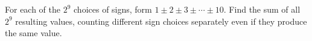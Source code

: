 For each of the $2^9$ choices of signs, form $1\pm2\pm3\pm\cdots\pm10$. Find the sum of all $2^9$ resulting values, counting different sign choices separately even if they produce the same value.
